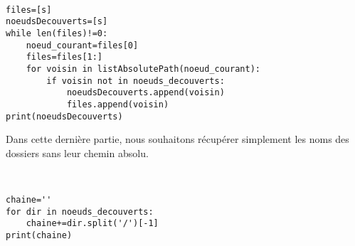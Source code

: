
\begin{solution}~\ \\
\begin{verbatim}
files=[s]
noeudsDecouverts=[s]
while len(files)!=0:
    noeud_courant=files[0]
    files=files[1:] 
    for voisin in listAbsolutePath(noeud_courant):
        if voisin not in noeuds_decouverts:
            noeudsDecouverts.append(voisin)
            files.append(voisin)
print(noeudsDecouverts)
\end{verbatim}
\end{solution}

Dans cette dernière partie, nous souhaitons récupérer simplement les noms des dossiers sans leur chemin absolu.


\begin{solution}~\ \\
\begin{verbatim}
chaine=''
for dir in noeuds_decouverts:
    chaine+=dir.split('/')[-1]
print(chaine)
\end{verbatim}
\end{solution}

\newpage








